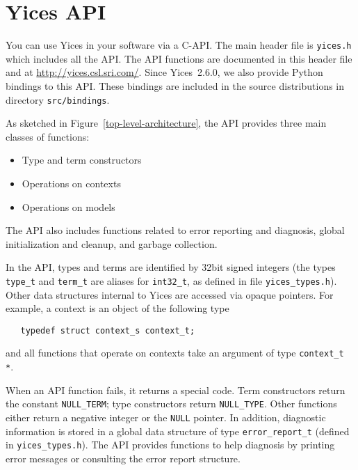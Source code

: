 \documentclass[11pt,twoside,fleqn,openright,titlepage]{cslreport}
\begin{document}
\chapter{Yices API}
\label{yices-api}


You can use Yices in your software via a C-API. The main header file
is \texttt{yices.h} which includes all the API. The API functions are
documented in this header file and at
\url{http://yices.csl.sri.com/}. Since Yices~2.6.0, we also provide
Python bindings to this API. These bindings are included in the source
distributions in directory \texttt{src/bindings}.

As sketched in Figure~\ref{top-level-architecture}, the API provides
three main classes of functions:
\begin{itemize}
\item Type and term constructors
\item Operations on contexts
\item Operations on models
\end{itemize}
The API also includes functions related to error reporting and
diagnosis, global initialization and cleanup, and garbage collection.

In the API, types and terms are identified by 32bit signed integers
(the types \texttt{type\_t} and \texttt{term\_t} are aliases for
\texttt{int32\_t}, as defined in file \texttt{yices\_types.h}). Other
data structures internal to Yices are accessed via opaque
pointers. For example, a context is an object of the following type
\begin{small}
\begin{verbatim}
   typedef struct context_s context_t;
\end{verbatim}
\end{small}
and all functions that operate on contexts take an argument of type
\texttt{context\_t *}.

When an API function fails, it returns a special code. Term
constructors return the constant \texttt{NULL\_TERM}; type
constructors return \texttt{NULL\_TYPE}. Other functions either return
a negative integer or the \texttt{NULL} pointer. In addition,
diagnostic information is stored in a global data structure of type
\texttt{error\_report\_t} (defined in \texttt{yices\_types.h}). The API
provides functions to help diagnosis by printing error messages or
consulting the error report structure.
\end{document}
